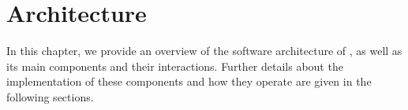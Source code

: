 
\chapter{\GP{} Architecture}
\label{chap:arch}

In this chapter, we provide an overview of the software architecture of \GP, as well as its main components and their interactions.
Further details about the implementation of these components and how they operate are given in the following sections.



\newpage


